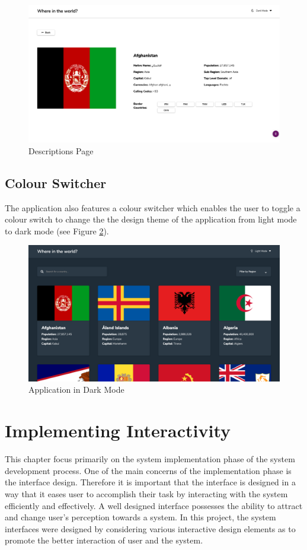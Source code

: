 \documentclass[twoside, a4paper, 12pt]{report}
\begin{document}
\begin{figure}
	\centering
	\includegraphics[width=1.0\textwidth]{DescriptionsPage.png}
	\caption{Descriptions Page}
	\label{fig:descriptions_page}
\end{figure}

\subsection{Colour Switcher}
The application also features a colour switcher which enables the user to toggle a colour switch to change the the design theme of the application from light mode to dark mode (see Figure \ref{fig:darkmode}).

\begin{figure} [h]
	\centering
	\includegraphics[width=1.0\textwidth]{darkmode.png}
	\caption{Application in Dark Mode}
	\label{fig:darkmode}
\end{figure}

\section{Implementing Interactivity}
This chapter focus primarily on the system implementation phase of the system development process. One of the main concerns of the implementation phase is the interface design. Therefore it is important that the interface is designed in a way that it eases user to accomplish their task by interacting with the system efficiently and effectively. A well designed interface possesses the ability to attract and change user’s perception towards a system. In this project, the system interfaces were designed by considering various interactive design elements as to promote the better interaction of user and the system.

\printbibliography
\end{document}
